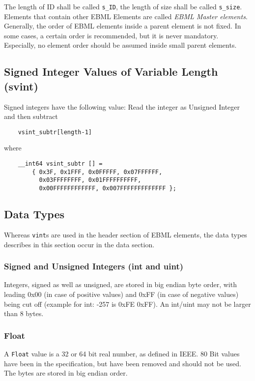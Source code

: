\documentclass[12pt]{article}
\begin{document}
The length of ID shall be called \texttt{s\_ID}, the length of size shall be called \texttt{s\_size}.
Elements that contain other EBML Elements are called \textsl{EBML Master elements}.\\[0.2cm]
Generally, the order of EBML elements inside a parent element is not fixed. In some cases,
a certain order is recommended, but it is never mandatory. Especially, no element order should be 
assumed inside small parent elements.

\subsection{Signed Integer Values of Variable Length (svint)}
Signed integers have the following value:
Read the integer as Unsigned Integer and then subtract \begin{verbatim}    vsint_subtr[length-1]\end{verbatim}

where
\begin{verbatim}
    __int64 vsint_subtr [] = 
        { 0x3F, 0x1FFF, 0x0FFFFF, 0x07FFFFFF, 
          0x03FFFFFFFF, 0x01FFFFFFFFFF, 
          0x00FFFFFFFFFFFF, 0x007FFFFFFFFFFFFF };
\end{verbatim}

\subsection{Data Types}

Whereas \texttt{vint}s are used in the header section of EBML elements, the data types describes in this section occur in the data section.

\subsubsection{Signed and Unsigned Integers (int and uint)}

Integers, signed as well as unsigned, are stored in big endian byte order, with leading 0x00 (in case of positive values) and 0xFF (in case of negative values) being cut off (example for int: -257 is 0xFE 0xFF). An int/uint may not be larger than 8 bytes.

\subsubsection{Float}
A \texttt{Float} value is a 32 or 64 bit real number, as defined in IEEE. 80 Bit values have been in the specification, but have been removed and should not be used. The bytes are stored in big endian order. 
\end{document}
